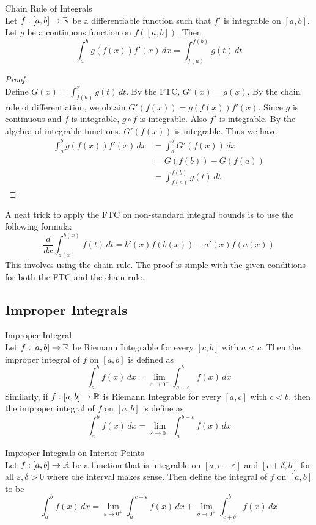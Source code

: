 \documentclass[a4paper]{article}
\begin{document}
\begin{thm}{Chain Rule of Integrals}{}\\ Let $f:[a,b]\to\mathbb{R}$ be a differentiable function such that $f'$ is integrable on $[a,b]$. Let $g$ be a continuous function on $f([a,b])$. Then $$\int_{a}^{b}g\left(f(x)\right)f'(x)\,dx=\int_{f(a)}^{f(b)}g(t)\,dt$$ 
\begin{proof}\\
Define $G(x)=\int_{f(a)}^xg(t)\,dt$. By the FTC, $G'(x)=g(x)$. By the chain rule of differentiation, we obtain $G'(f(x))=g(f(x))f'(x)$. Since $g$ is continuous and $f$ is integrable, $g\circ f$ is integrable. Also $f'$ is integrable. By the algebra of integrable functions, $G'(f(x))$ is integrable. Thus we have
\begin{align*}
\int_a^bg(f(x))f'(x)\,dx&=\int_a^bG'(f(x))\,dx\\
&=G(f(b))-G(f(a))\tag{FTC}\\
&=\int_{f(a)}^{f(b)}g(t)\,dt\tag{FTC}
\end{align*}
\end{proof}
\end{thm}

A neat trick to apply the FTC on non-standard integral bounds is to use the following formula: $$\frac{d}{dx}\int_{a(x)}^{b(x)}f(t)\,dt=b'(x)f(b(x))-a'(x)f(a(x))$$ This involves using the chain rule. The proof is simple with the given conditions for both the FTC and the chain rule. 

\subsection{Improper Integrals}
\begin{defn}{Improper Integral}{}\\ Let $f:[a,b]\to\mathbb{R}$ be Riemann Integrable for every $[c,b]$ with $a<c$. Then the improper integral of $f$ on $[a,b]$ is defined as $$\int_a^bf(x)\,dx=\lim_{\varepsilon\to0^+}\int_{a+\varepsilon}^bf(x)\,dx $$
Similarly, if $f:[a,b]\to\mathbb{R}$ is Riemann Integrable for every $[a,c]$ with $c<b$, then the improper integral of $f$ on $[a,b]$ is define as $$\int_a^bf(x)\,dx=\lim_{\varepsilon\to0^+}\int_a^{b-\varepsilon}f(x)\,dx$$
\end{defn}

\begin{defn}{Improper Integrals on Interior Points}{}\\ Let $f:[a,b]\to\mathbb{R}$ be a function that is integrable on $[a,c-\varepsilon]$ and $[c+\delta,b]$ for all $\varepsilon,\delta>0$ where the interval makes sense. Then define the integral of $f$ on $[a,b]$ to be $$\int_a^bf(x)\,dx=\lim_{\varepsilon\to0^+}\int_a^{c-\varepsilon}f(x)\,dx+\lim_{\delta\to0^+}\int_{c+\delta}^bf(x)\,dx$$
\end{defn}
\end{document}
